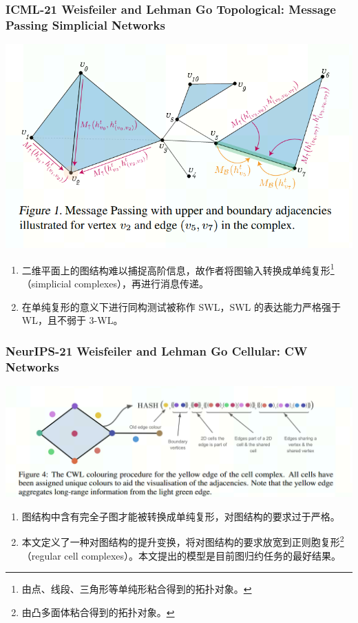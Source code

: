 \documentclass{beamer}
\begin{document}
\begin{frame}

  \frametitle{ICML-21 Weisfeiler and Lehman Go Topological: Message Passing Simplicial Networks}
  \begin{center}
    \includegraphics[scale=0.5]{figs/SWL.png}    
  \end{center}
  \begin{enumerate}
    \item 二维平面上的图结构难以捕捉高阶信息，故作者将图输入转换成单纯复形\footnote{由点、线段、三角形等单纯形粘合得到的拓扑对象。}（simplicial complexes），再进行消息传递。
    \item 在单纯复形的意义下进行同构测试被称作 SWL，SWL 的表达能力严格强于 WL，且不弱于 3-WL。
  \end{enumerate}

\end{frame}

\begin{frame}

  \frametitle{NeurIPS-21 Weisfeiler and Lehman Go Cellular: CW Networks}
  \begin{center}
    \includegraphics[scale=0.6]{figs/CWL.png}    
  \end{center}
  \begin{enumerate}
    \item 图结构中含有完全子图才能被转换成单纯复形，对图结构的要求过于严格。
    \item 本文定义了一种对图结构的提升变换，将对图结构的要求放宽到正则胞复形\footnote{由凸多面体粘合得到的拓扑对象。}（regular cell complexes）。本文提出的模型是目前图归约任务的最好结果。
  \end{enumerate}

\end{frame}
\end{document}
